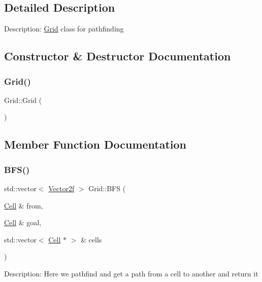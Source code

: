 \subsection{Detailed Description}
Description\+: \mbox{\hyperlink{class_grid}{Grid}} class for pathfinding 

\subsection{Constructor \& Destructor Documentation}
\mbox{\label{class_grid_a4ac9ff4f63552b4c61ff90fcb35ad66c}} 
\subsubsection{\texorpdfstring{Grid()}{Grid()}}
{\footnotesize\ttfamily Grid\+::\+Grid (\begin{DoxyParamCaption}{ }\end{DoxyParamCaption})}



\subsection{Member Function Documentation}
\mbox{\label{class_grid_af12fcb815f27ae538ac1dd8178c30b6f}} 
\subsubsection{\texorpdfstring{BFS()}{BFS()}}
{\footnotesize\ttfamily std\+::vector$<$ \mbox{\hyperlink{class_vector2f}{Vector2f}} $>$ Grid\+::\+B\+FS (\begin{DoxyParamCaption}\item[{\mbox{\hyperlink{class_cell}{Cell}} \&}]{from,  }\item[{\mbox{\hyperlink{class_cell}{Cell}} \&}]{goal,  }\item[{std\+::vector$<$ \mbox{\hyperlink{class_cell}{Cell}} $\ast$ $>$ \&}]{cells }\end{DoxyParamCaption})}

Description\+: Here we pathfind and get a path from a cell to another and return it \mbox{\label{class_grid_a0d44166cb6fff74a173d454023c1cce4}} 
